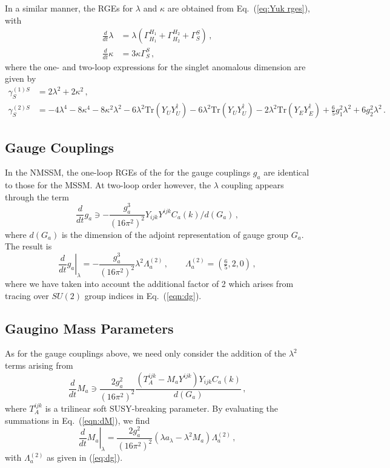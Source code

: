 \documentclass[final,3p,times,pdflatex]{elsarticle}
\newcommand{\lamsq}{\lambda^2}
\newcommand{\kapsq}{\kappa^2}
\newcommand{\tr}{\mathrm{Tr}}
\newcommand{\dt}{\frac{d}{dt}}
\begin{document}
In a similar manner, the RGEs for $\lambda$ and $\kappa$ are obtained from Eq.~(\ref{eq:Yuk rges}), with
\begin{align}
\dt\lambda &= \lambda (\Gamma^{H_1}_{H_1} + \Gamma^{H_2}_{H_2} + \Gamma^S_S)\,, \\
%
\dt\kappa &= 3\kappa \Gamma_S^S\,,
\end{align}
%
where the one- and two-loop expressions for the singlet anomalous dimension 
are given by
%
\begin{align}
\gamma_S^{(1)S} &= 2\lamsq + 2\kapsq\,,\\
%
\gamma_S^{(2)S} &= -4\lambda^4 - 8\kappa^4 - 8 \kapsq\lamsq 
- 6\lamsq \tr(Y_UY_U^\dagger) - 6\lamsq \tr(Y_UY_U^\dagger) 
- 2\lamsq \tr(Y_EY_E^\dagger) + \tfrac{6}{5}g_1^2\lamsq + 6g_2^2\lamsq\,.
\end{align} 



\subsection{Gauge Couplings}
In the NMSSM, the one-loop RGEs of the for the gauge couplings $g_a$ are 
identical to those for the MSSM.  At two-loop order however, the $\lambda$ 
coupling appears through the term
%
\begin{equation}
\dt g_a \ni - \frac{g_a^3}{(16\pi^2)^2} Y_{ijk}Y^{ijk} C_a(k)/d(G_a)\,,  
\label{eqn:dg}
\end{equation}
%
where $d(G_a)$ is the dimension of the adjoint representation of gauge group 
$G_a$.  The result is
%
\begin{equation}
\left. \dt g_a\right|_\lambda = -\frac{g_a^3}{(16\pi^2)^2}\lamsq \Lambda_a^{(2)}\,,
\qquad \Lambda_a^{(2)} = (\tfrac{6}{5},2,0)\,,
\label{eq:dg}
\end{equation}
%
where we have taken into account the additional factor of 2 which arises from 
tracing over $SU(2)$ group indices in Eq.~(\ref{eqn:dg}).

\subsection{Gaugino Mass Parameters}
As for the gauge couplings above, we need only consider the addition of the 
$\lambda^2$ terms arising from
%
\begin{equation}
\dt M_a \ni \frac{2g_a^2}{(16\pi^2)^2} 
\frac{(T_A^{ijk} - M_a Y^{ijk}) Y_{ijk}C_a(k)}{d(G_a)}\,,
\label{eqn:dM}
\end{equation}
%
where $T_A^{ijk}$ is a trilinear soft SUSY-breaking parameter. By evaluating the summations in Eq.~(\ref{eqn:dM}), we find
%
\begin{equation}
\left. \dt M_a\right|_{\lambda} = \frac{2g_a^2}{(16\pi^2)^2} (\lambda a_\lambda - \lambda^2 M_a)\Lambda^{(2)}_a\,,
\end{equation}
%
with $\Lambda_a^{(2)}$ as given in (\ref{eq:dg}).
\end{document}
